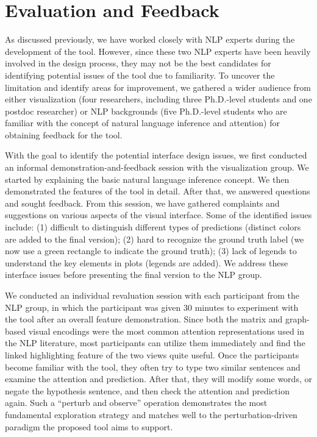 \section{Evaluation and Feedback}
%
As discussed previously, we have worked closely with NLP experts during the development of the tool. However, since these two NLP experts have been heavily involved in the design process, they may not be the best candidates for identifying potential issues of the tool due to familiarity.  To uncover the limitation and identify areas for improvement, we gathered a wider audience from either visualization (four researchers, including three Ph.D.-level students and one postdoc researcher) or NLP backgrounds (five Ph.D.-level students who are familiar with the concept of natural language inference and attention) for obtaining feedback for the tool.  

With the goal to identify the potential interface design issues, we first conducted an informal demonstration-and-feedback session with the visualization group. We started by explaining the basic natural language inference concept. We then demonstrated the features of the tool in detail. After that, we answered questions and sought feedback.
%
From this session, we have gathered complaints and suggestions on various aspects of the visual interface. Some of the identified issues include: (1) difficult to distinguish different types of predictions (distinct colors are added to the final version); (2) hard to recognize the ground truth label (we now use a green rectangle to indicate the ground truth); (3) lack of legends to understand the key elements in plots (legends are added). We address these interface issues before presenting the final version to the NLP group.

We conducted an individual revaluation session with each participant from the NLP group, in which the participant was given 30 minutes to experiment with the tool after an overall feature demonstration. 
%
Since both the matrix and graph-based visual encodings were the most common attention representations used in the NLP literature, most participants can utilize them immediately and find the linked highlighting feature of the two views quite useful.
% 
Once the participants become familiar with the tool, they often try to type two similar sentences and examine the attention and prediction. After that, they will modify some words, or negate the hypothesis sentence, and then check the attention and prediction again.
%
Such a ``perturb and observe'' operation demonstrates the most fundamental exploration strategy and matches well to the perturbation-driven paradigm the proposed tool aims to support.

